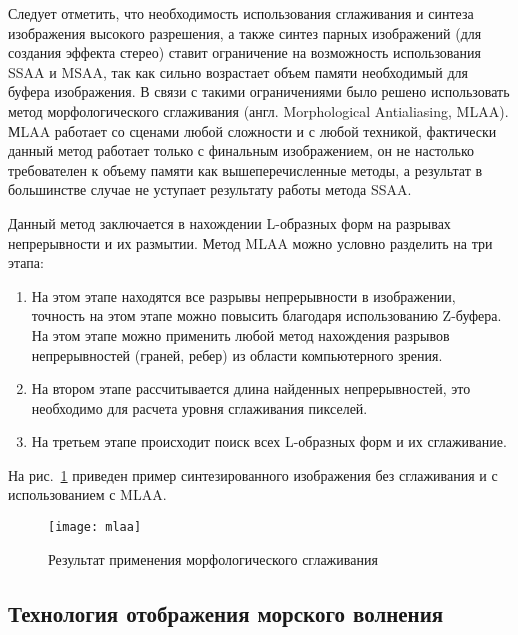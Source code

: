 Следует отметить, что необходимость использования сглаживания и синтеза изображения высокого разрешения, а также синтез парных изображений (для создания эффекта стерео) ставит ограничение на возможность использования SSAA и MSAA, так как сильно возрастает объем памяти необходимый для буфера изображения. В связи с такими ограничениями было решено использовать метод морфологического сглаживания (англ. Morphological Antialiasing, MLAA)\citep{mlaa}. МLAA работает со сценами любой сложности и с любой техникой, фактически данный метод работает только с финальным изображением, он не настолько требователен к объему памяти как вышеперечисленные методы, а результат в большинстве случае не уступает результату работы метода SSAA. 

Данный метод заключается в нахождении \glqq L\grqq-образных форм на  разрывах непрерывности и их размытии. Метод MLAA можно условно разделить на три этапа: 

\begin{enumerate}
	\item	На этом этапе находятся все разрывы непрерывности в изображении, 
			точность на этом этапе можно повысить благодаря использованию Z-буфера. 
			На этом этапе можно применить любой метод нахождения разрывов непрерывностей 
			(граней, ребер) из области компьютерного зрения.
	\item	На втором этапе рассчитывается длина найденных непрерывностей, это необходимо 
			для расчета уровня сглаживания пикселей. 
	\item	На третьем этапе происходит поиск всех \glqq L\grqq-образных форм и их сглаживание.
\end{enumerate}

На рис.~\ref{mlaa} приведен пример синтезированного изображения без сглаживания и с использованием с MLAA.

\begin{figure}[ht]
\begin{center}
\texttt{[image: mlaa]}
\end{center}
\caption{Результат применения морфологического сглаживания}
\label{mlaa}
\end{figure}






\subsection{Технология отображения морского волнения}


